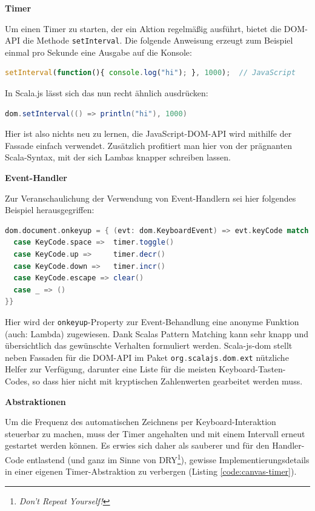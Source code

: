 \documentclass[a4paper, 12pt, hidelinks, listof=totoc, listoftables=totoc, bibliography=totoc]{scrreprt}
\newcommand{\scala}[1]{\lstinline[language=Scala, style=inline]|#1|}
\newcommand{\MyMiniSec}[1]{\rmfamily\fontsize{12}{15}\selectfont
	\vspace{7pt}\textbf{#1} %
}
\begin{document}
\pagebreak

\MyMiniSec{Timer}

Um einen Timer zu starten, der ein Aktion regelmäßig ausführt, bietet die \ac{DOM}-\ac{API} die Methode \scala{setInterval}. Die folgende Anweisung erzeugt zum Beispiel einmal pro Sekunde eine Ausgabe auf die Konsole:

\begin{lstlisting}[language=JavaScript, style=snippet]
setInterval(function(){ console.log("hi"); }, 1000);  // JavaScript
\end{lstlisting}

In Scala.js lässt sich das nun recht ähnlich ausdrücken:

\begin{lstlisting}[language=Scala, style=snippet]
dom.setInterval(() => println("hi"), 1000)
\end{lstlisting}

Hier ist also nichts neu zu lernen, die JavaScript-\ac{DOM}-\ac{API} wird mithilfe der Fassade einfach verwendet. Zusätzlich profitiert man hier von der prägnanten Scala-Syntax, mit der sich Lambas knapper schreiben lassen.


\MyMiniSec{Event-Handler}

Zur Veranschaulichung der Verwendung von Event-Handlern sei hier folgendes Beispiel herausgegriffen:

\begin{lstlisting}[language=Scala, style=snippet]
dom.document.onkeyup = { (evt: dom.KeyboardEvent) => evt.keyCode match {
  case KeyCode.space =>  timer.toggle()
  case KeyCode.up =>     timer.decr()
  case KeyCode.down =>   timer.incr()
  case KeyCode.escape => clear()
  case _ => ()
}}
\end{lstlisting}

Hier wird der \scala{onkeyup}-Property zur Event-Behandlung eine anonyme Funktion (auch: Lambda) zugewiesen. Dank Scalas Pattern Matching kann sehr knapp und übersichtlich das gewünschte Verhalten formuliert werden. Scala-js-dom stellt neben Fassaden für die \ac{DOM}-\ac{API} im Paket \scala{org.scalajs.dom.ext} nützliche Helfer zur Verfügung, darunter eine Liste für die meisten Keyboard-Tasten-Codes, so dass hier nicht mit kryptischen Zahlenwerten gearbeitet werden muss.


\MyMiniSec{Abstraktionen}

Um die Frequenz des automatischen Zeichnens per Keyboard-Interaktion steuerbar zu machen, muss der Timer angehalten und mit einem Intervall erneut gestartet werden können. Es erwies sich daher als sauberer und für den Handler-Code entlastend (und ganz im Sinne von DRY\footnote{\emph{Don't Repeat Yourself!}}), gewisse Implementierungsdetails in einer eigenen Timer-Abstraktion zu verbergen (Listing \ref{code:canvas-timer}).
\end{document}
